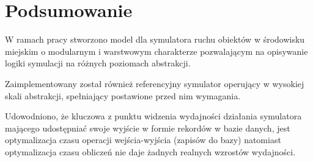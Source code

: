 \chapter{Podsumowanie}
\par{
W ramach pracy stworzono model dla symulatora ruchu obiektów w środowisku miejskim o modularnym i warstwowym charakterze pozwalającym na opisywanie logiki symulacji na różnych poziomach abstrakcji.
}
\par{
Zaimplementowany został również referencyjny symulator operujący w wysokiej skali abstrakcji, spełniający postawione przed nim wymagania.
}
\par{
Udowodniono, że kluczowa z punktu widzenia wydajności działania symulatora mającego udostępniać swoje wyjście w formie rekordów w bazie danych, jest optymalizacja czasu operacji wejścia-wyjścia (zapisów do bazy) natomiast optymalizacja czasu obliczeń nie daje żadnych realnych wzrostów wydajności.
}